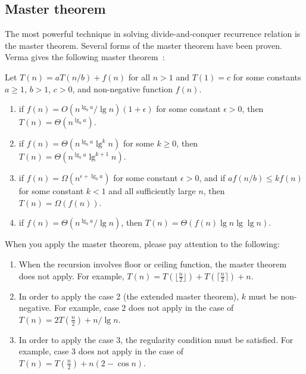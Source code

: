 \subsection{Master theorem}
The most powerful technique in solving divide-and-conquer recurrence relation is the master theorem.
Several forms of the master theorem have been proven. Verma gives the following master theorem~\cite{Verma1994}:
\begin{theorem}
Let $T(n) = aT(n / b) + f(n)$ for all $n > 1$ and $T(1) = c$ for some constants $a \geq 1$, $b > 1$, $c > 0$, and non-negative function $f(n)$.
\begin{enumerate}
\item if $f(n) = O(n^{\lg_b a} / \lg n)(1 + \epsilon)$ for some constant $\epsilon > 0$, then $T(n) = \Theta(n^{\lg_b a})$.
\item if $f(n) = \Theta(n^{\lg_b a} \lg^k n)$ for some $k \geq 0$, then $T(n) = \Theta(n^{\lg_b a} \lg^{k+1} n)$.
\item if $f(n) = \Omega(n^{\epsilon + \lg_b a})$ for some constant $\epsilon > 0$, and if $af(n/b) \leq kf(n)$ for some constant $k < 1$ and all sufficiently large $n$, then $T(n) = \Omega(f(n))$.
\item if $f(n) = \Theta(n^{\lg_b a} / \lg n)$, then $T(n) = \Theta(f(n) \lg n \lg \lg n)$.
\end{enumerate}
\end{theorem}

\begin{remark} When you apply the master theorem, please pay attention to the following:
\begin{enumerate}
\item When the recursion involves floor or ceiling function, the master theorem does not apply. For example, $T(n) = T(\lfloor \frac{n}{2} \rfloor) + T(\lceil \frac{n}{2} \rceil) + n$. 
\item In order to apply the case 2 (the extended master theorem), $k$ must be non-negative. For example, case 2 does not apply in the case of $T(n) = 2T(\frac{n}{2}) + n/ \lg n$.
\item In order to apply the case 3, the regularity condition must be satisfied. For example, case 3 does not apply in the case of $T(n) = T(\frac{n}{2}) + n(2 - \cos n)$.
\end{enumerate}
\end{remark}

